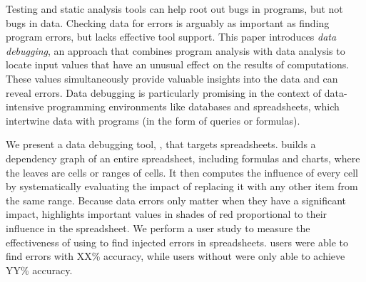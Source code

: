 Testing and static analysis tools can help root out bugs in programs,
but not bugs in data. Checking data for errors is arguably as
important as finding program errors, but lacks effective tool
support.
This paper introduces \emph{data debugging}, an approach that combines
program analysis with data analysis to locate input values that have
an unusual effect on the results of computations. These values
simultaneously provide valuable insights into the data and can reveal
errors.  Data debugging is particularly promising in the context of
data-intensive programming environments like databases and
spreadsheets, which intertwine data with programs (in the form of
queries or formulas).

We present a data debugging tool, \checkcell{}, that targets
spreadsheets. \checkcell{} builds a dependency graph of an entire
spreadsheet, including formulas and charts, where the leaves are cells
or ranges of cells. It then computes the influence of every cell by
systematically evaluating the impact of replacing it with any other
item from the same range. Because data errors only matter when they
have a significant impact, \checkcell{} highlights important values in
shades of red proportional to their influence in the spreadsheet.  We
perform a user study to measure the effectiveness of using
\checkcell{} to find injected errors in spreadsheets. \checkcell{} users
were able to find errors with XX\% accuracy, while users without
\checkcell{} were only able to achieve YY\% accuracy.
